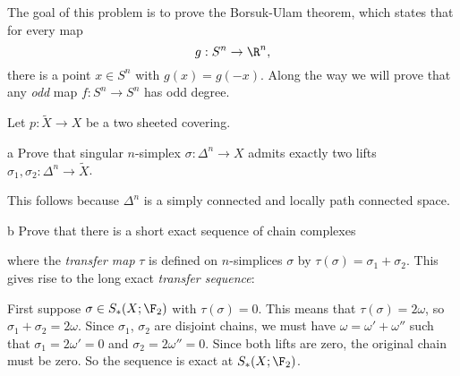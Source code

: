 \documentclass[11pt,letterpaper]{article}
\begin{document}
\begin{problem}
    The goal of this problem is to prove the Borsuk-Ulam theorem, which states that for every map
    \[
        g : S^n \to \R^n,
    \]
    there is a point $x\in S^n$ with $g(x)=g(-x)$. Along the way we will prove that any \emph{odd} map $f : S^n \to S^n$ has odd degree.
\end{problem}

\begin{solution}
    Let $p : \widetilde{X} \to X$ be a two sheeted covering. 
    \begin{partproblem}{a}
        Prove that singular $n$-simplex $\sigma : \Delta^n \to X$ admits exactly two lifts $\sigma_1, \sigma_2 : \Delta^n \to \widetilde{X}$.
    \end{partproblem}
    \quad This follows because $\Delta^n$ is a simply connected and locally path connected space.

    \begin{partproblem}{b}
        Prove that there is a short exact sequence of chain complexes
        \begin{center}
        \end{center}
        where the \emph{transfer map} $\tau$ is defined on $n$-simplices $\sigma$ by $\tau(\sigma)=\sigma_1+\sigma_2$. This gives rise to the long exact \emph{transfer sequence}:
        \begin{center}
        \end{center}
    \end{partproblem}
    \quad First suppose $\sigma \in S_*(X; \F_2)$ with $\tau(\sigma)=0$. This means that $\tau(\sigma)=2\omega$, so $\sigma_1+\sigma_2=2\omega$. Since $\sigma_1$, $\sigma_2$ are disjoint chains, we must have $\omega = \omega' + \omega''$ such that $\sigma_1=2\omega'=0$ and $\sigma_2=2\omega''=0$. Since both lifts are zero, the original chain must be zero. So the sequence is exact at $S_*(X; \F_2)$.
    

\end{solution}
\end{document}
